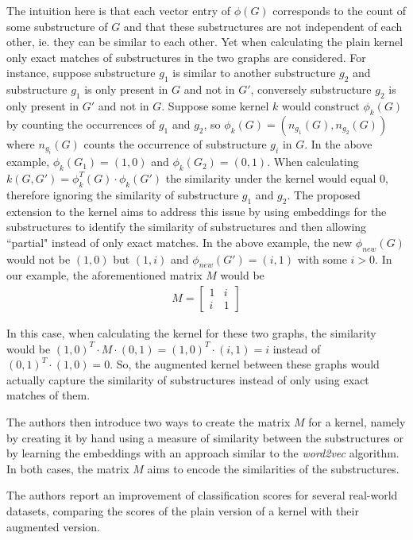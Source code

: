 The intuition here is that each vector entry of $\phi(G)$ corresponds to the count of some substructure of $G$ and that these substructures are not independent of each other, ie. they can be similar to each other.
Yet when calculating the plain kernel only exact matches of substructures in the two graphs are considered.
For instance, suppose substructure $g_1$ is similar to another substructure $g_2$ and substructure $g_1$ is only present in $G$ and not in $G'$, conversely substructure $g_2$ is only present in $G'$ and not in $G$.
Suppose some kernel $k$ would construct $\phi_k(G)$ by counting the occurrences of $g_1$ and $g_2$, so $\phi_k(G) = (n_{g_1}(G), n_{g_2}(G))$ where $n_{g_i}(G)$ counts the occurrence of substructure $g_i$ in $G$.
In the above example, $\phi_k(G_1) = (1, 0)$ and $\phi_k(G_2) = (0, 1)$. When calculating $k(G, G') = \phi_k^T(G) \cdot \phi_k(G') $ the similarity under the kernel would equal 0, therefore ignoring the similarity of substructure $g_1$ and $g_2$.
The proposed extension to the kernel aims to address this issue by using embeddings for the substructures to identify the similarity of substructures and then allowing ``partial" instead of only exact matches.
In the above example, the new $\phi_{new}(G)$ would not be $(1, 0)$ but $(1, i)$ and $\phi_{new}(G') = (i, 1)$ with some $i > 0$.
In our example, the aforementioned matrix $M$ would be
\begin{align*}
M = \begin{bmatrix}
1 & i \\
i & 1
\end{bmatrix}
\end{align*}

In this case, when calculating the kernel for these two graphs, the similarity would be $(1, 0)^T \cdot M \cdot (0, 1) = (1, 0)^T \cdot (i, 1) = i$ instead of $(0, 1)^T \cdot (1, 0) = 0$.
So, the augmented kernel between these graphs would actually capture the similarity of substructures instead of only using exact matches of them.

The authors then introduce two ways to create the matrix $M$ for a kernel, namely by creating it by hand using a measure of similarity between the substructures or by learning the embeddings with an approach similar to the \textit{word2vec} algorithm.
In both cases, the matrix $M$ aims to encode the similarities of the substructures.

The authors report an improvement of classification scores for several real-world datasets, comparing the scores of the plain version of a kernel with their augmented version.

